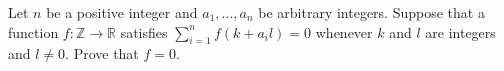 Let \( n\) be a positive integer and \( a_{1}, \ldots, a_{n}\) be arbitrary integers. Suppose that a function \( f\colon  \mathbb{Z}\to \mathbb{R}\) satisfies \( \sum_{i=1}^{n}f(k+a_{i}l) = 0\) whenever \( k\) and \( l\) are integers and \( l \ne 0\). Prove that \( f = 0\).